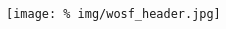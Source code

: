 \begin{frame}
\begin{columns}[t]
\begin{column}{0.59\textwidth}
    \end{column}
  \end{columns}

  \vspace{0.5cm}





  \begin{figure}
  \centering
  \texttt{[image: \%
  img/wosf\_header.jpg]} %
\end{figure}



\end{frame}

